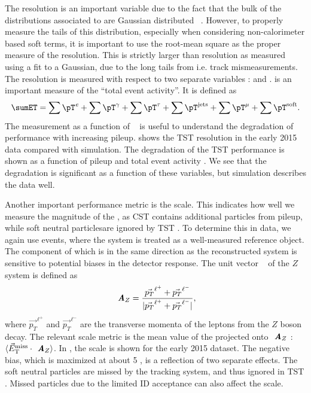 The \met resolution is an important variable due to the fact that the bulk of the distributions associated to  are Gaussian distributed ~\cite{Aad2012}.
However, to properly measure the tails of this distribution, especially when considering non-calorimeter based soft terms, it is important to use the root-mean square as the proper measure of the resolution.
This is strictly larger than resolution as measured using a fit to a Gaussian, due to the long tails from i.e. track mismeasurements.
The resolution is measured with respect to two separate variables : \sumET and \npv.
\sumET is an important measure of the ``total event activity''.
It is defined as
\begin{equation}
  \sumET =
  \sum \pT^{\text{\textit{e}}}       +
  \sum \pT^{\mathrm{\gamma}}   +
  \sum \pT^{\mathrm{\tau}}        +
  \sum \pT^{\text{jets}}      +
  \sum \pT^{\mathrm{\mu}}     +
  \sum \pT^{\text{soft}}.
 \label{eq:sumet}
\end{equation}
The measurement as a function of \npv~ is useful to understand the degradation of \met performance with increasing pileup.
 shows the TST \met resolution in the early 2015 data compared with simulation.
The degradation of the TST \met performance is shown as a function of pileup \npv and total event activity \sumET.
We see that the degradation is significant as a function of these variables, but simulation describes the data well.

Another important performance metric is the \met scale.
This indicates how well we measure the magnitude of the \met, as CST \met contains additional particles from pileup, while soft neutral particles\footnotemark are ignored by TST \met.
To determine this in data, we again use \Zmm events, where the \Zmm system is treated as a well-measured reference object.
The component of \met which is in the same direction as the reconstructed \Zmm system is sensitive to potential biases in the detector response.
The unit vector \Az~ of the $Z$ system is defined as
\begin{equation}
\mathbf { \textbf{ \textit {A}}}_Z =\frac{\vec{p_T}^{\ell^+}+\vec{p_T}^{\ell^-}}{|\vec{p_T}^{\ell^+}+\vec{p_T}^{\ell^-}|},
\end{equation}
where $\vec{p_T}^{\ell^+}$ and $\vec{p_T}^{\ell^-}$ are the transverse momenta of the leptons from the $Z$ boson decay.
The relevant scale metric is the mean value of the \metvec projected onto $\mathbf { \textbf{ \textit {A}}}_Z$ :  $\langle\vec{E}_{\mathrm{T}}^{\mathrm{miss}}\cdot \mathbf { \textbf{ \textit {A}}}_Z \rangle$.
In , the scale is shown for the early 2015 dataset.
The negative bias, which is maximized at about 5 \GeV, is a reflection of two separate effects.
The soft neutral particles are missed by the tracking system, and thus ignored in TST \met.
Missed particles due to the limited ID acceptance can also affect the scale.

